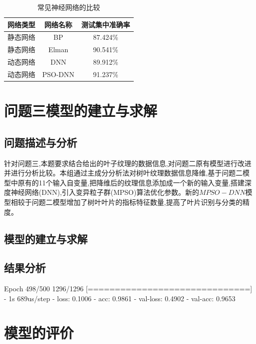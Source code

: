 \documentclass{whutmod}
\begin{document}
		\begin{table}[H]
	 \centering	\caption{常见神经网络的比较}\label{heng}
		\begin{tabular}{ccc}
			\toprule[2pt]
			\multicolumn{1}{m{3cm}}{\centering 网络类型}
			 & \multicolumn{1}{m{3cm}}{\centering 网络名称}
			  &\multicolumn{1}{m{4cm}}{\centering 测试集中准确率}
			  \\
			\midrule[1pt]
			静态网络	 &  BP &87.424\%  \\ 
			静态网络	 &  Elman &90.541\%  \\ 
			动态网络	 &  DNN &89.912\%  \\ 
			动态网络	 &  PSO-DNN &91.237\%  \\ 
			\bottomrule[2pt]	
		\end{tabular}

	\end{table}



	\section{问题三模型的建立与求解}
    \subsection{问题描述与分析}
    针对问题三,本题要求结合给出的叶子纹理的数据信息,对问题二原有模型进行改进并进行分析比较。本组通过主成分分析法对树叶纹理数据信息降维,基于问题二模型中原有的11个输入自变量,把降维后的纹理信息添加成一个新的输入变量,搭建深度神经网络(DNN),引入变异粒子群(MPSO)算法优化参数。新的$MPSO-DNN$模型相较于问题二模型增加了树叶叶片的指标特征数量,提高了叶片识别与分类的精度。
    	
	
		
    \subsection{模型的建立与求解}
    
    \subsection{结果分析}
	
	Epoch 498/500
	1296/1296 [==============================] - 1s 689us/step - loss: 0.1006 - acc: 0.9861 - val-loss: 0.4902 - val-acc: 0.9653
	\section{模型的评价}
\end{document}
